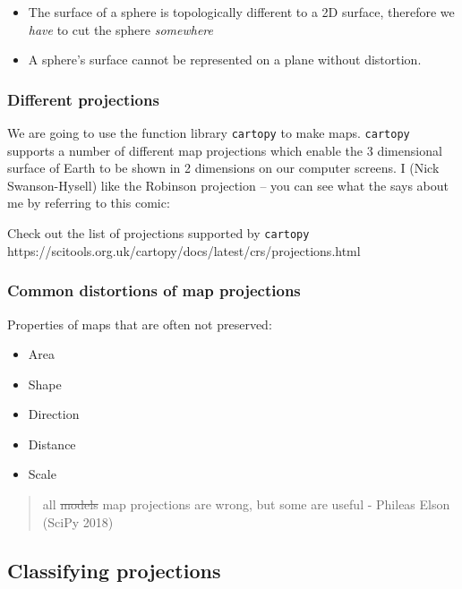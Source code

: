 \documentclass[11pt]{article}
\providecommand{\tightlist}{%
      \setlength{\itemsep}{0pt}\setlength{\parskip}{0pt}}
\begin{document}
\begin{itemize}
\tightlist
\item
  The surface of a sphere is topologically different to a 2D surface,
  therefore we \emph{have} to cut the sphere \emph{somewhere}
\item
  A sphere's surface cannot be represented on a plane without
  distortion.
\end{itemize}

    \hypertarget{different-projections}{%
\subsubsection{Different projections}\label{different-projections}}

We are going to use the function library \texttt{cartopy} to make maps.
\texttt{cartopy} supports a number of different map projections which
enable the 3 dimensional surface of Earth to be shown in 2 dimensions on
our computer screens. I (Nick Swanson-Hysell) like the Robinson
projection -- you can see what the says about me by referring to this
comic:

Check out the list of projections supported by \texttt{cartopy}
https://scitools.org.uk/cartopy/docs/latest/crs/projections.html

    \hypertarget{common-distortions-of-map-projections}{%
\subsubsection{Common distortions of map
projections}\label{common-distortions-of-map-projections}}

Properties of maps that are often not preserved:

\begin{itemize}
\tightlist
\item
  Area
\item
  Shape
\item
  Direction
\item
  Distance
\item
  Scale
\end{itemize}

    \begin{quote}
all \sout{models} map projections are wrong, but some are useful -
Phileas Elson (SciPy 2018)
\end{quote}

    \hypertarget{classifying-projections}{%
\subsection{Classifying projections}\label{classifying-projections}}
\end{document}
